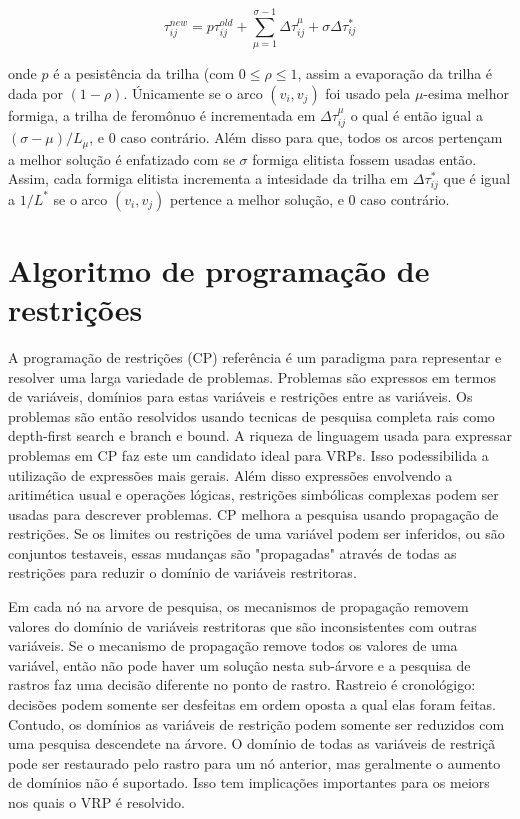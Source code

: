 \[\tau^{new}_{ij} = p \tau^{old}_{ij} + \sum_{\mu=1}^{\sigma-1} \Delta\tau^{\mu}_{ij}+\sigma
\Delta\tau^{*}_{ij}\]

 onde $p$ é a pesistência da trilha (com $0 \leq \rho \leq 1$, assim a evaporação da trilha é dada
por $(1-\rho)$. Únicamente se o arco $(v_i, v_j)$ foi usado pela $\mu$-esima melhor formiga, a
trilha de feromônuo é incrementada em $\Delta \tau_{ij}^\mu$ o qual é então igual a $(\sigma -
\mu)/L_\mu$, e $0$ caso contrário. Além disso para que, todos os arcos pertençam a melhor solução
é enfatizado com se $\sigma$ formiga elitista fossem usadas então. Assim, cada formiga elitista
incrementa a intesidade da trilha em $\Delta \tau_{ij}^*$ que é igual a $1/L^*$ se o arco $(v_i,
v_j)$ pertence a melhor solução, e $0$ caso contrário.


\section{Algoritmo de programação de restrições}

 A programação de restrições (CP) {\color{red} referência} é um paradigma para representar e
resolver uma larga variedade de problemas. Problemas são expressos em termos de variáveis, domínios
para estas variáveis e restrições entre as variáveis. Os problemas são então resolvidos usando
tecnicas de pesquisa completa rais como depth-first search e branch e bound. A riqueza de linguagem
usada para expressar problemas em CP faz este um candidato ideal para VRPs. Isso podessibilida a
utilização de expressões mais gerais. Além disso expressões envolvendo a aritimética usual e
operações lógicas, restrições simbólicas complexas podem ser usadas para descrever problemas. CP
melhora a pesquisa usando propagação de restrições. Se os limites ou restrições de uma variável
podem ser inferidos, ou são conjuntos testaveis, essas mudanças são "propagadas" através de todas as
restrições para reduzir o domínio de variáveis restritoras.

 Em cada nó na arvore de pesquisa, os mecanismos de propagação removem valores do domínio de
variáveis restritoras que são inconsistentes com outras variáveis. Se o mecanismo de propagação
remove todos os valores de uma variável, então não pode haver um solução nesta sub-árvore e a
pesquisa de rastros faz uma decisão diferente no ponto de rastro. Rastreio é cronológigo: decisões
podem somente ser desfeitas em ordem oposta a qual elas foram feitas. Contudo, os domínios as
variáveis de restrição podem somente ser reduzidos com uma pesquisa descendete na árvore. O domínio
de todas as variáveis de restriçã pode ser restaurado pelo rastro para um nó anterior, mas
geralmente o aumento de domínios não é suportado. Isso tem implicações importantes para os meiors
nos quais o VRP é resolvido.


